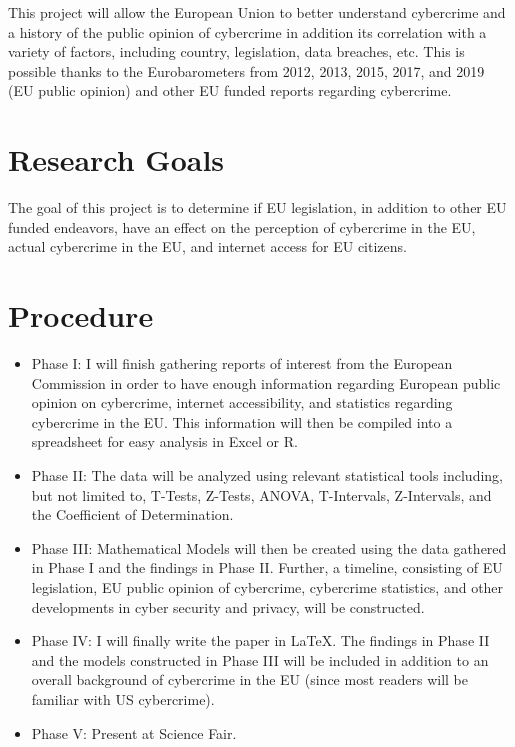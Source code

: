 \documentclass{article}
\begin{document}
This project will allow the European Union to better understand cybercrime and a history of the public opinion of cybercrime in addition its correlation with a variety of factors, including country, legislation, data breaches, etc. This is possible thanks to the Eurobarometers from 2012, 2013, 2015, 2017, and 2019 (EU public opinion) and other EU funded reports regarding cybercrime. 

{\color{EUblue}\section{Research Goals}}

The goal of this project is to determine if EU legislation, in addition to other EU funded endeavors, have an effect on the perception of cybercrime in the EU, actual cybercrime in the EU, and internet access for EU citizens. 

\vspace{\baselineskip} 

{\color{EUblue}\section{Procedure}}

\begin{itemize}
    \item Phase I: I will finish gathering reports of interest from the European Commission in order to have enough information regarding European public opinion on cybercrime, internet accessibility, and statistics regarding cybercrime in the EU. This information will then be compiled into a spreadsheet for easy analysis in Excel or R. 
    \item Phase II: The data will be analyzed using relevant statistical tools including, but not limited to, T-Tests, Z-Tests, ANOVA, T-Intervals, Z-Intervals, and the Coefficient of Determination. 
    \item Phase III: Mathematical Models will then be created using the data gathered in Phase I and the findings in Phase II. Further, a timeline, consisting of EU legislation, EU public opinion of cybercrime, cybercrime statistics, and other developments in cyber security and privacy, will be constructed. 
    \item Phase IV: I will finally write the paper in LaTeX. The findings in Phase II and the models constructed in Phase III will be included in addition to an overall background of cybercrime in the EU (since most readers will be familiar with US cybercrime). 
    \item Phase V: Present at Science Fair. 
\end{itemize}
\end{document}
